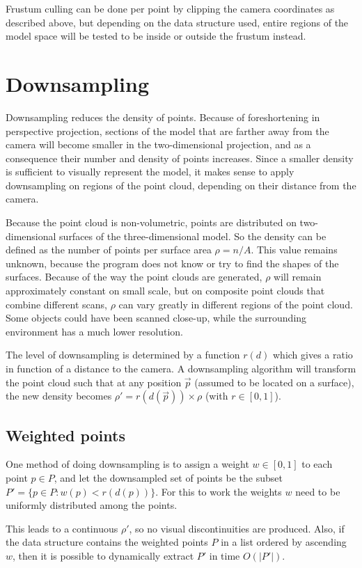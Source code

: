 \documentclass[a4paper,10pt,abstracton,notitlepage]{scrreprt}
\begin{document}
Frustum culling can be done per point by clipping the camera coordinates as described above, but depending on the data structure used, entire regions of the model space will be tested to be inside or outside the frustum instead.


\section{Downsampling} \label{sec:downsampling}
Downsampling reduces the density of points. Because of foreshortening in perspective projection, sections of the model that are farther away from the camera will become smaller in the two-dimensional projection, and as a consequence their number and density of points increases. Since a smaller density is sufficient to visually represent the model, it makes sense to apply downsampling on regions of the point cloud, depending on their distance from the camera.

Because the point cloud is non-volumetric, points are distributed on two-dimensional surfaces of the three-dimensional model. So the density can be defined as the number of points per surface area $\rho = n/A$. This value remains unknown, because the program does not know or try to find the shapes of the surfaces. Because of the way the point clouds are generated, $\rho$ will remain approximately constant on small scale, but on composite point clouds that combine different scans, $\rho$ can vary greatly in different regions of the point cloud. Some objects could have been scanned close-up, while the surrounding environment has a much lower resolution. 

The level of downsampling is determined by a function $r(d)$ which gives a ratio in function of a distance to the camera. A downsampling algorithm will transform the point cloud such that at any position $\overrightarrow{p}$ (assumed to be located on a surface), the new density becomes $\rho' = r(d(\overrightarrow{p})) \times \rho$ (with $r \in [0, 1]$).

\subsection{Weighted points}
One method of doing downsampling is to assign a weight $w \in [0, 1]$ to each point $p \in P$, and let the downsampled set of points be the subset $P' = \{ p \in P : w(p) < r(d(p)) \}$. For this to work the weights $w$ need to be uniformly distributed among the points.

This leads to a continuous $\rho'$, so no visual discontinuities are produced. Also, if the data structure contains the weighted points $P$ in a list ordered by ascending $w$, then it is possible to dynamically extract $P'$ in time $O(|P'|)$.
\end{document}
